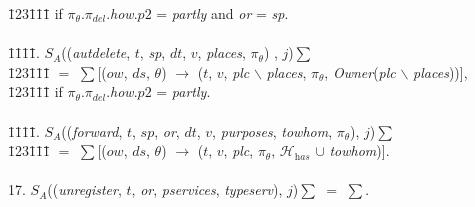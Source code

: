 \documentclass[a4paper]{article}
\begin{document}
\begin{tabbing}
		\=123\=1\=1\=1\= \kill
		\>\> if  $\pi_{\theta}$.$\pi_{del}$.\textit{how}.$p2$ =  \textit{partly} and \textit{or} = \textit{sp}.  \\\\	
\=1\=1\=1\=1\= .	$S_A$((\textit{autdelete}, $t$, \textit{sp},  $dt$, $v$,  \textit{places}, $\pi_{\theta}$) , $j$)$\sum$ \\ 
		\=123\=1\=1\=1\= \kill
		\>\> $=$ $\sum$[($ow$, $ds$, $\theta$) $\rightarrow$ ($t$, $v$, \textit{plc} $\backslash$ \textit{places}, $\pi_{\theta}$,  \textit{Owner}(\textit{plc} $\backslash$ \textit{places}))], \\ 
		\=123\=1\=1\=1\= \kill
		\>\> if  $\pi_{\theta}$.$\pi_{del}$.\textit{how}.$p2$ =  \textit{partly}.  \\\\ 
\=1\=1\=1\=1\= . $S_A$((\textit{forward}, $t$, $sp$, \textit{or}, $dt$, $v$,   \textit{purposes}, \textit{towhom}, $\pi_{\theta}$), $j$)$\sum$\\ 
		\=123\=1\=1\=1\= \kill
		\>\> $=$ $\sum$[($ow$, $ds$, $\theta$) $\rightarrow$ ($t$, $v$,  \textit{plc}, $\pi_{\theta}$, $\mathcal{H}_{\textit{has}}$ $\cup$ \textit{towhom})].\\\\ 
17. $S_A$((\textit{unregister}, $t$, \textit{or}, \textit{pservices}, \textit{typeserv}), $j$)$\sum$ $=$ $\sum$.
\end{tabbing}
\end{document}
